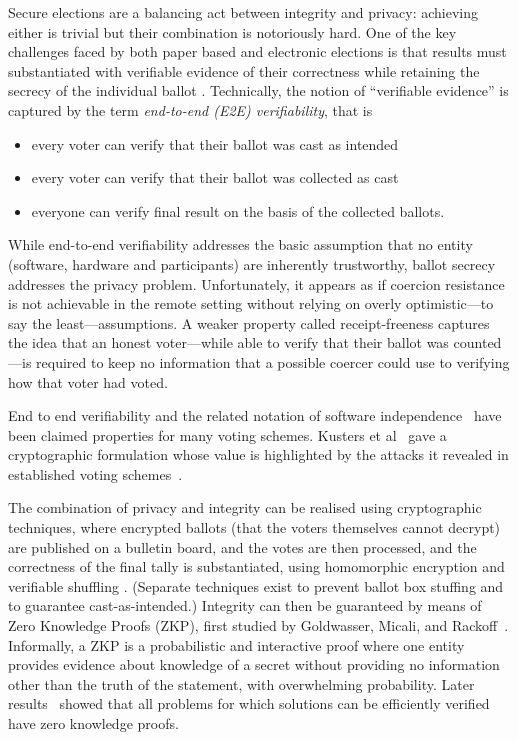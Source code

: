\documentclass{llncs}
\begin{document}
Secure elections are a balancing act between integrity and privacy:
achieving either is trivial but their combination is notoriously hard.
One of the key challenges faced by both paper based and electronic
elections is that results must substantiated with
verifiable evidence of their correctness while retaining the secrecy
of the individual ballot \cite{Bernhard:2017:PES}.  Technically, the
notion of ``verifiable evidence'' is captured by the term 
\emph{end-to-end (E2E) verifiability}, that is
\begin{itemize}
  \item every voter can verify that their ballot was cast as
  intended
  \item every voter can verify that their ballot was collected as
  cast
  \item everyone can verify final result on the basis of the
  collected ballots.
\end{itemize}
While end-to-end verifiability addresses the basic assumption that
no entity (software, hardware and participants) are inherently
trustworthy, ballot secrecy addresses the privacy problem.
Unfortunately, it appears as if coercion resistance is not achievable  
in the remote setting without relying on overly optimistic---to say the least---assumptions.
A weaker property called receipt-freeness captures the idea that an honest 
voter---while able to verify that their ballot was counted---is required to keep 
no information that a possible coercer could use to verifying how that voter had voted.

End to end verifiability and the related notation of software independence~\cite{Rivest:2008:PTRS}
 have been claimed properties for many voting schemes.  Kusters et al~\cite{Kusters:2010:CCS} gave
 a cryptographic formulation whose value is highlighted by the attacks it revealed in established voting 
 schemes~\cite{Kusters:2012:SP}.

The combination of privacy and integrity can be realised using cryptographic techniques, where
encrypted ballots (that the voters themselves cannot decrypt) are
published on a bulletin board, and the votes are then processed, and
the correctness of the final tally is substantiated, using
homomorphic encryption \cite{Hirt:2000:ERF} and verifiable shuffling
\cite{Bayer:2012:EZK}. (Separate techniques exist to prevent ballot
box stuffing and to guarantee cast-as-intended.)
Integrity can then be guaranteed by means of Zero Knowledge Proofs
(ZKP),
first studied by Goldwasser, Micali, and Rackoff~\cite{Goldwasser:1985:STOC}.
Informally, a ZKP is a probabilistic and interactive proof where one
entity provides evidence about knowledge of a secret without
providing no information other than the truth of the statement, with
overwhelming probability. 
Later results~\cite{Goldreich:1991:ACM}\cite{Ben-Or:1988:CRYPTO} showed that 
all problems for which solutions can be efficiently verified have zero knowledge
proofs.
\end{document}
